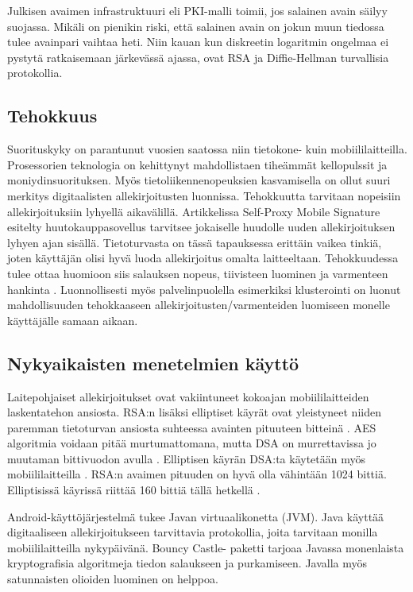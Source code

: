\documentclass[finnish]{tktltiki2}
\theoremstyle{definition}
\theoremstyle{remark}
\begin{document}
Julkisen avaimen infrastruktuuri eli PKI-malli toimii, jos salainen avain säilyy suojassa. Mikäli on pienikin riski, että salainen avain on jokun muun tiedossa tulee avainpari vaihtaa heti. Niin kauan kun diskreetin logaritmin ongelmaa ei pystytä ratkaisemaan järkevässä ajassa, ovat RSA ja Diffie-Hellman turvallisia protokollia. \cite{enti}
	  

\subsection{Tehokkuus}

Suorituskyky on parantunut vuosien saatossa niin tietokone- kuin mobiililaitteilla. Prosessorien teknologia on kehittynyt mahdollistaen tiheämmät kellopulssit ja moniydinsuorituksen. Myös tietoliikennenopeuksien kasvamisella on ollut suuri merkitys digitaalisten allekirjoitusten luonnissa. Tehokkuutta tarvitaan nopeisiin allekirjoituksiin lyhyellä aikavälillä. Artikkelissa Self-Proxy Mobile Signature esitelty huutokauppasovellus tarvitsee jokaiselle huudolle uuden  allekirjoituksen lyhyen ajan sisällä. Tietoturvasta on tässä tapauksessa erittäin vaikea tinkiä, joten käyttäjän olisi hyvä luoda allekirjoitus omalta laitteeltaan. Tehokkuudessa tulee ottaa huomioon siis salauksen nopeus, tiivisteen luominen ja varmenteen hankinta \cite{proxy}. Luonnollisesti myös palvelinpuolella esimerkiksi klusterointi on luonut mahdollisuuden tehokkaaseen allekirjoitusten/varmenteiden luomiseen monelle käyttäjälle samaan aikaan.

\subsection{Nykyaikaisten menetelmien käyttö}

Laitepohjaiset allekirjoitukset ovat vakiintuneet kokoajan mobiililaitteiden laskentatehon ansiosta. RSA:n lisäksi elliptiset käyrät ovat yleistyneet niiden paremman tietoturvan ansiosta suhteessa avainten pituuteen bitteinä \cite{ECC}. AES algoritmia voidaan pitää murtumattomana, mutta DSA on murrettavissa jo muutaman bittivuodon avulla \cite{gsm}. Elliptisen käyrän DSA:ta käytetään myös mobiililaitteilla \cite{webs}. RSA:n avaimen pituuden on hyvä olla vähintään 1024 bittiä. Elliptisissä käyrissä riittää 160 bittiä tällä hetkellä \cite{ECC}.

Android-käyttöjärjestelmä tukee Javan virtuaalikonetta (JVM). Java käyttää digitaaliseen allekirjoitukseen tarvittavia protokollia, joita tarvitaan monilla mobiililaitteilla nykypäivänä. Bouncy Castle- paketti tarjoaa Javassa monenlaista kryptografisia algoritmeja tiedon salaukseen ja purkamiseen. Javalla myös satunnaisten olioiden luominen on helppoa. \cite{enti}   
\end{document}
